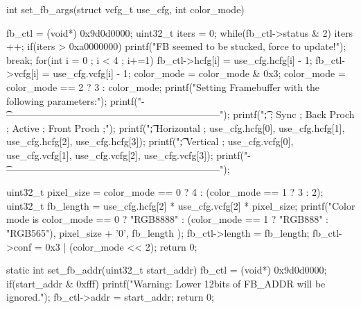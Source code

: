 \begin{CodeBlock}[language=BookC]
int set_fb_args(struct vcfg_t use_cfg, int color_mode) {
    fb_ctl = (void*) 0x9d0d0000;
    uint32_t iters = 0;
    while(fb_ctl->status & 2) {
        iters ++;
        if(iters > 0xa0000000) {
            printf("FB seemed to be stucked, force to update!\n");
            break;
        }
    }
    for(int i = 0 ; i < 4 ; i+=1) {
        fb_ctl->hcfg[i] = use_cfg.hcfg[i] - 1;
        fb_ctl->vcfg[i] = use_cfg.vcfg[i] - 1;
    }
    color_mode = color_mode & 0x3;
    color_mode = color_mode == 2 ? 3 : color_mode;
    printf("Setting Framebuffer with the following parameters:\n");
    printf("\t-------------------------------------------------------------------\n");
    printf("\t;            ; Sync       ; Back Proch ; Active     ; Front Proch ;\n");
    printf("\t; Horizontal ; %
           use_cfg.hcfg[0], use_cfg.hcfg[1], use_cfg.hcfg[2], use_cfg.hcfg[3]);
    printf("\t; Vertical   ; %
           use_cfg.vcfg[0], use_cfg.vcfg[1], use_cfg.vcfg[2], use_cfg.vcfg[3]);
    printf("\t-------------------------------------------------------------------\n");

    uint32_t pixel_size = color_mode == 0 ? 4 : (color_mode == 1 ? 3 : 2);
    uint32_t fb_length = use_cfg.hcfg[2] * use_cfg.vcfg[2] * pixel_size;
    printf("Color mode is %
        color_mode == 0 ? "RGB8888" : (color_mode == 1 ? "RGB888" : "RGB565"),
        pixel_size + '0',
        fb_length
    );
    fb_ctl->length = fb_length;
    fb_ctl->conf = 0x3 | (color_mode << 2);
    return 0;
}

static int set_fb_addr(uint32_t start_addr) {
    fb_ctl = (void*) 0x9d0d0000;
    if(start_addr & 0xfff) {
        printf("Warning: Lower 12bits of FB_ADDR will be ignored.\n");
    }
    fb_ctl->addr = start_addr;
    return 0;
} 


\end{CodeBlock}

